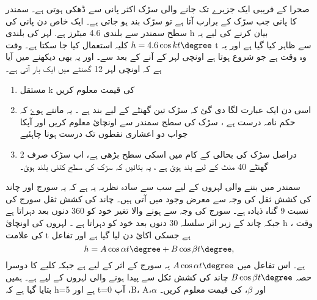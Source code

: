صحرا کے قریبی ایک جزیرے تک جانے والی سڑک اکثر پانی سے ڈھکی ہوتی ہے۔ سمندر کا پانی جب سڑک کے برارب آتا ہے تو سڑک بند ہو جاتی ہے۔ ایک خاص دن پانی کی سطح سمندر سے بلندی 4.6 میٹرز ہے.   لہر کی بلندی  h  بیان کرنے کی لیے یہ  \(h=4.6\cos kt\degree \) کلیہ استعمال کیا جا سکتا ہے۔ وقت  t  سے ظاہر کیا گیا ہے اور یہ وہ وقت ہے جو شروع ہوتا ہے اونچی لہر کے آنے کے بعد سے۔ اور یہ بھی دیکھنے میں آیا ہے کہ اونچی لہر 12 گھنٹے میں ایک بار آتی ہے۔
\begin{enumerate} 
\item 
  مستقل   k    کی قیمت معلوم کریں
\item
اسی دن ایک عبارت لگا دی گئ کہ سڑک تین گھنٹے کے لیے بند ہے ۔ یہ مانتے ہوۓ کہ حکم نامہ درست ہے ، سڑک کی سطح سمندر سے اونچائ معلوم کریں اور آپکا جواب دو اعشاری نقطوں تک درست ہونا چاہئیے
\item
دراصل سڑک کی بحالی کے کام میں اسکی سطح بڑھی ہے، اب سڑک صرف 2 گھنٹے 40 منٹ کے لیے بند ہوئ ہے ، یہ بتائیں کہ سڑک کی سطح کتنی بلند ہوئ۔
\end{enumerate}
 

سمندر میں بننے والی لہروں کے لیے سب سے سادہ نظریہ یہ ہے کہ یہ سورج اور چاند کی کشش ثقل کی وجہ سے معرض وجود میں آتی ہیں۔ چاند کی کشش ثقل سورج کی نسبت 9 گناہ ذیادہ ہے۔ سورج کی وجہ سے ہونے والا تغیر خود کو 360 دنوں بعد دہراتا ہے جبکہ چاند کے زیر اثر سلسلہ 30 دنوں بعد خود کو دہراتا ہے ۔ لہروں کی اونچائ h ، وقت کی علامت  t    ہے جسکی اکائ دن لیا گیا ہے
اور تفاعل  \[h= A\cos\alpha t\degree+B\cos\beta t\degree, \]  ہے۔
اس تفاعل میں \(A\cos\alpha t\degree \)  یہ سورج کے اثر کے لیے ہے جبکہ کلیے کا دوسرا حصہ \(B\cos\beta t\degree \) چاند کی کشش ثکل سے پیدا ہونے والی لہروں کے لیے ہے۔ ہمیں بتایا گیا ہے کہ 
 h=5   
ہے اور  t=0 آپ ،B، A،\(\alpha \)  اور  \(\beta \)، کی قیمت معلوم کریں۔ 
     









 









